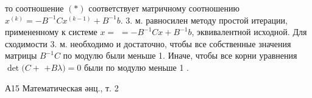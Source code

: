 \documentclass[10pt]{article}
\begin{document}
то соотношение $(*)$ соответствует матричному соотношению $x^{(k)}=-B^{-1} C x^{(k-1)}+B^{-1} b$. 3. м. равносилен методу простой итерации, примененному к системе $x=$ $=-B^{-1} C x+B^{-1} b$, эквивалентной исходной. Для сходимости 3. м. необходимо и достаточно, чтобы все собственные значения матрицы $B^{-1} C$ по модулю были меньше 1. Иначе, чтобы все корни уравнения $\operatorname{det}(C+$ $+B \lambda)=0$ были по модулю меньше 1 .



А15 Математическая әнц., т. 2
\end{document}
